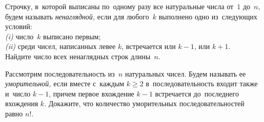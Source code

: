 \begin{problems}
\item
Строчку, в~которой выписаны по~одному разу все натуральные числа от~$1$ до~$n$,
будем называть \emph{ненаглядной,} если для любого~$k$ выполнено одно
из~следующих условий:
\\
\emph{(i)}\enspace
число~$k$ выписано первым;
\\
\emph{(ii)}\enspace
среди чисел, написанных левее $k$, встречается или $k - 1$, или $k + 1$.
\\
Найдите число всех ненаглядных строк длины~$n$.

\item
Рассмотрим последовательность из~$n$ натуральных чисел.
Будем называть ее \emph{уморительной,} если вместе с~каждым $k \geq 2$
в~последовательность входит также и~число $k - 1$, причем первое вхождение
$k - 1$ встречается до~последнего вхождения $k$.
Докажите, что количество уморительных последовательностей равно $n!$.

\end{problems}

